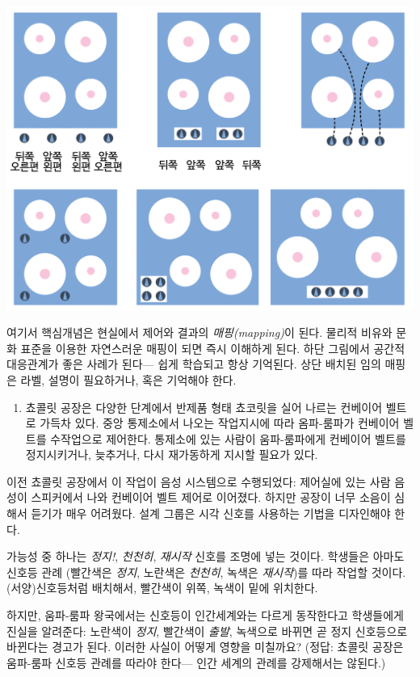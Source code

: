 \documentclass[]{article}
\begin{document}
\includegraphics{csunplugged/06-part/img/ch20-hci/19-hci-02-stove.png}

여기서 핵심개념은 현실에서 제어와 결과의 \emph{매핑(mapping)}이 된다.
물리적 비유와 문화 표준을 이용한 자연스러운 매핑이 되면 즉시 이해하게
된다. 하단 그림에서 공간적 대응관계가 좋은 사례가 된다--- 쉽게 학습되고
항상 기억된다. 상단 배치된 임의 매핑은 라벨, 설명이 필요하거나, 혹은
기억해야 한다.

\begin{enumerate}
\itemsep1pt\parskip0pt
\item
  쵸콜릿 공장은 다양한 단계에서 반제품 형태 쵸코릿을 실어 나르는
  컨베이어 벨트로 가득차 있다. 중앙 통제소에서 나오는 작업지시에 따라
  옴파-룸파가 컨베이어 벨트를 수작업으로 제어한다. 통제소에 있는 사람이
  움파-룸파에게 컨베이어 벨트를 정지시키거나, 늦추거나, 다시 재가동하게
  지시할 필요가 있다.
\end{enumerate}

이전 쵸콜릿 공장에서 이 작업이 음성 시스템으로 수행되었다: 제어실에 있는
사람 음성이 스피커에서 나와 컨베이어 벨트 제어로 이어졌다. 하지만 공장이
너무 소음이 심해서 듣기가 매우 어려웠다. 설계 그룹은 시각 신호를
사용하는 기법을 디자인해야 한다.

가능성 중 하나는 \emph{정지!}, \emph{천천히}, \emph{재시작} 신호를
조명에 넣는 것이다. 학생들은 아마도 신호등 관례 (빨간색은 \emph{정지},
노란색은 \emph{천천히}, 녹색은 \emph{재시작})를 따라 작업할 것이다.
(서양)신호등처럼 배치해서, 빨간색이 위쪽, 녹색이 밑에 위치한다.

하지만, 움파-룸파 왕국에서는 신호등이 인간세계와는 다르게 동작한다고
학생들에게 진실을 알려준다: 노란색이 \emph{정지}, 빨간색이 \emph{출발},
녹색으로 바뀌면 곧 정지 신호등으로 바뀐다는 경고가 된다. 이러한 사실이
어떻게 영향을 미칠까요? (정답: 쵸콜릿 공장은 움파-룸파 신호등 관례를
따라야 한다--- 인간 세계의 관례를 강제해서는 않된다.)
\end{document}
